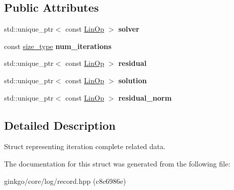 \subsection*{Public Attributes}
\begin{DoxyCompactItemize}
\item 
\mbox{\label{structgko_1_1log_1_1iteration__complete__data_af485c2d5eff3114076e057b9870106a8}} 
std\+::unique\+\_\+ptr$<$ const \hyperlink{classgko_1_1LinOp}{Lin\+Op} $>$ {\bfseries solver}
\item 
\mbox{\label{structgko_1_1log_1_1iteration__complete__data_a8d5fd7bf89def95a904e95b3f0848594}} 
const \hyperlink{namespacegko_a6e5c95df0ae4e47aab2f604a22d98ee7}{size\+\_\+type} {\bfseries num\+\_\+iterations}
\item 
\mbox{\label{structgko_1_1log_1_1iteration__complete__data_a52473dac8d5ac7849b6dbd7523cdeb37}} 
std\+::unique\+\_\+ptr$<$ const \hyperlink{classgko_1_1LinOp}{Lin\+Op} $>$ {\bfseries residual}
\item 
\mbox{\label{structgko_1_1log_1_1iteration__complete__data_a232f312a1a4c2f8817e208ec2013c454}} 
std\+::unique\+\_\+ptr$<$ const \hyperlink{classgko_1_1LinOp}{Lin\+Op} $>$ {\bfseries solution}
\item 
\mbox{\label{structgko_1_1log_1_1iteration__complete__data_a26a787138ac7faeced0420c5d02371cb}} 
std\+::unique\+\_\+ptr$<$ const \hyperlink{classgko_1_1LinOp}{Lin\+Op} $>$ {\bfseries residual\+\_\+norm}
\end{DoxyCompactItemize}


\subsection{Detailed Description}
Struct representing iteration complete related data. 

The documentation for this struct was generated from the following file\+:\begin{DoxyCompactItemize}
\item 
ginkgo/core/log/record.\+hpp (c8c6986e)\end{DoxyCompactItemize}
